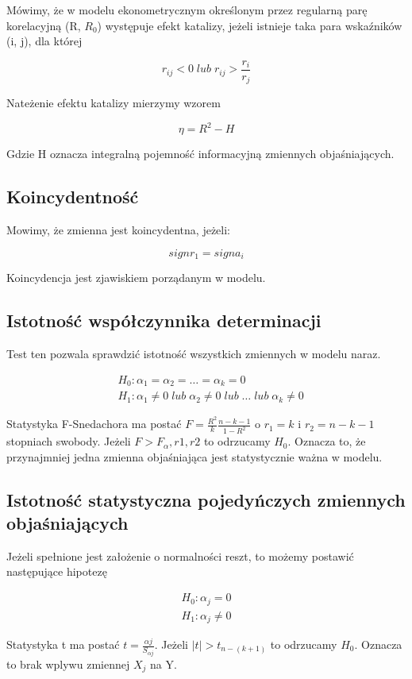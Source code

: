 Mówimy, że w modelu ekonometrycznym określonym przez regularną
parę korelacyjną (R, \(R_0\)) występuje efekt katalizy, jeżeli istnieje taka
para wskaźników (i, j), dla której

\begin{equation}
    r_{ij} < 0 \; lub \; r_{ij}  > \frac{r_i}{r_j}
\end{equation}

Nateżenie efektu katalizy mierzymy wzorem

\[ \eta = R^2 - H \]

Gdzie H oznacza integralną pojemność informacyjną zmiennych objaśniających.

\subsection{Koincydentność}\label{subsec:koincydentność}

Mowimy, że zmienna jest koincydentna, jeżeli:

\begin{equation}
    signr_1 = signa_i
\end{equation}

Koincydencja jest zjawiskiem porządanym w modelu.

\subsection{Istotność współczynnika determinacji}\label{subsec:istotność-współczynnika-determinacji}

Test ten pozwala sprawdzić istotność wszystkich zmiennych w modelu naraz.

\begin{equation}
    \begin{split}
        &H_0: \alpha_1 = \alpha_2 = \dots = \alpha_k = 0 \\
        &H_1: \alpha_1 \ne 0 \; lub \; \alpha_2 \ne 0 \; lub \; \dots \; lub \; \alpha_k \ne 0
    \end{split}
\end{equation}

Statystyka F-Snedachora ma postać \(F = \frac{R^2}{k} \frac{n-k-1}{1-R^2}\) o \(r_1 = k\) i \(r_2 = n-k-1\) stopniach swobody.
Jeżeli \(F > F_\alpha,r1,r2 \) to odrzucamy \(H_0\).
Oznacza to, że przynajmniej jedna zmienna objaśniająca jest statystycznie ważna w modelu.

\subsection{Istotność statystyczna pojedyńczych zmiennych objaśniających}\label{subsec:istotność-statystyczna-zmiennych-objaśniających}
Jeżeli spełnione jest założenie o normalności reszt, to możemy postawić następujące hipotezę

\begin{equation}
    \begin{split}
        H_0: \alpha_j = 0 \\
        H_1: \alpha_j \ne 0
    \end{split}
\end{equation}

Statystyka t ma postać \(t = \frac{\alpha j}{S_{\alpha j}}\).
Jeżeli \(|t| > t_{n -(k+1)}\) to odrzucamy \(H_0\).
Oznacza to brak wplywu zmiennej \(X_j\) na Y.
